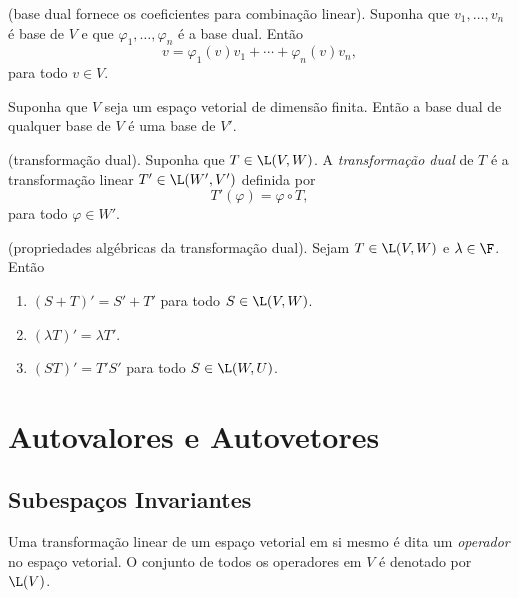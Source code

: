 \documentclass{article}
\begin{document}
\begin{prop} (base dual fornece os coeficientes para combinação linear).
    Suponha que \(v_1, \ldots, v_n\) é base de \(V\) e que \(\varphi_1, \ldots, \varphi_n\) é a base dual. Então 
    \begin{equation}
        v = \varphi_1(v)v_1 + \cdots + \varphi_n(v)v_n,    
    \end{equation}
    \noindent para todo \(v \in V\).
\end{prop}

\begin{prop}
    Suponha que \(V\) seja um espaço vetorial de dimensão finita. Então a base dual de qualquer base de \(V\) é uma base de \(V'\).
\end{prop}

\begin{defn} (transformação dual).
    Suponha que \(T \in \L(V, W)\). A \emph{transformação dual} de \(T\) é a transformação linear \(T' \in \L(W', V')\) definida por
    \[
        T'(\varphi) = \varphi \circ T,
    \]
    \noindent para todo \(\varphi \in W'\).
\end{defn}

\begin{prop} (propriedades algébricas da transformação dual).
    Sejam \(T \in \L(V, W)\) e \(\lambda \in \F\). Então
    \begin{enumerate}
        \item[(a)] \((S + T)' = S' + T'\) para todo \(S \in \L(V, W)\).
        \item[(b)] \((\lambda T)' = \lambda T'\).
        \item[(c)] \((ST)' = T'S'\) para todo \(S \in \L(W, U)\).
    \end{enumerate}
\end{prop}

\section{Autovalores e Autovetores}
\subsection{Subespaços Invariantes}

\begin{defn}
    Uma transformação linear de um espaço vetorial em si mesmo é dita um \emph{operador} no espaço vetorial. O conjunto de todos os operadores em \(V\) é denotado por \(\L(V)\).    
\end{defn}
\end{document}

